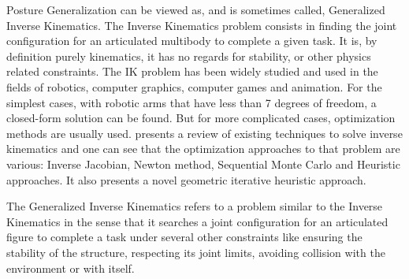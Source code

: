 Posture Generalization can be viewed as, and is sometimes called, Generalized Inverse Kinematics.
The Inverse Kinematics problem consists in finding the joint configuration for an articulated multibody to complete a given task.
It is, by definition purely kinematics, it has no regards for stability, or other physics related constraints.
The IK problem has been widely studied and used in the fields of robotics, computer graphics, computer games and animation.
For the simplest cases, with robotic arms that have less than 7 degrees of freedom, a closed-form solution can be found.
But for more complicated cases, optimization methods are usually used.
\cite{aristidou2009} presents a review of existing techniques to solve inverse kinematics and one can see that the optimization approaches to that problem are various: Inverse Jacobian, Newton method, Sequential Monte Carlo and Heuristic approaches. It also presents a novel geometric iterative heuristic approach.

The Generalized Inverse Kinematics refers to a problem similar to the Inverse Kinematics in the sense that it searches a joint configuration for an articulated figure to complete a task under several other constraints like ensuring the stability of the structure, respecting its joint limits, avoiding collision with the environment or with itself.


